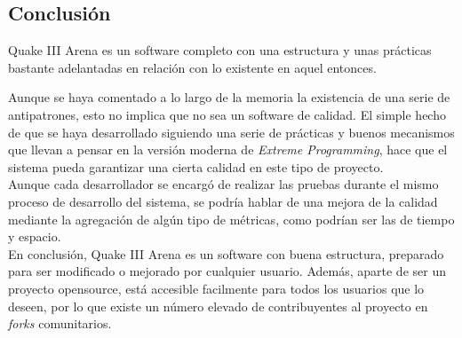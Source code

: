 \documentclass[a4paper,12pt]{report}
\begin{document}
    \subsection{Conclusión}
	Quake III Arena es un software completo con una estructura y unas prácticas bastante adelantadas en relación con lo existente en aquel entonces.
	
	Aunque se haya comentado a lo largo de la memoria la existencia de una serie de antipatrones, esto no implica que no sea un software de calidad. El simple hecho de que se haya desarrollado siguiendo una serie de prácticas y buenos mecanismos que llevan a pensar en la versión moderna de \textit{Extreme Programming}, hace que el sistema pueda garantizar una cierta calidad en este tipo de proyecto.\\
	
	Aunque cada desarrollador se encargó de realizar las pruebas durante el mismo proceso de desarrollo del sistema, se podría hablar de una mejora de la calidad mediante la agregación de algún tipo de métricas, como podrían ser las de tiempo y espacio.\\
	
	En conclusión, Quake III Arena es un software con buena estructura, preparado para ser modificado o mejorado por cualquier usuario. Además, aparte de ser un proyecto opensource, está accesible facilmente para todos los usuarios que lo deseen, por lo que existe un número elevado de contribuyentes al proyecto en \textit{forks} comunitarios.
	
    
	
\end{document}
